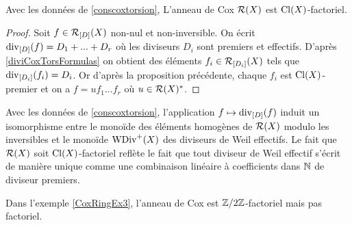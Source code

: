 \begin{thm}
Avec les données de \ref{conscoxtorsion}, L'anneau de Cox $\mathcal{R}(X)$ est $\operatorname{Cl}(X)$-factoriel.
\end{thm}
\begin{proof}
Soit $f\in\mathcal{R}_{[D]}(X)$ non-nul et non-inversible. On écrit $\operatorname{div}_{[D]}(f)=D_1+...+D_r$ où les diviseurs $D_i$ sont premiers et effectifs. D'après \ref{diviCoxTorsFormulas} on obtient des éléments $f_i\in\mathcal{R}_{[D_i]}(X)$ tels que $\operatorname{div}_{[D_i]}(f_i)=D_i$. Or d'après la proposition précédente, chaque $f_i$ est $\operatorname{Cl}(X)$-premier et on a $f=uf_1...f_r$ où $u\in\mathcal{R}(X)^*$.
\end{proof}

\begin{rem}
Avec les données de \ref{conscoxtorsion}, l'application $f\mapsto \operatorname{div}_{[D]}(f)$ induit un isomorphisme entre le monoïde des éléments homogènes de $\mathcal{R}(X)$ modulo les inversibles et le monoïde $\operatorname{WDiv}^+(X)$ des diviseurs de Weil effectifs. Le fait que $\mathcal{R}(X)$ soit $\operatorname{Cl}(X)$-factoriel reflète le fait que tout diviseur de Weil effectif s'écrit de manière unique comme une combinaison linéaire à coefficients dans $\mathbb{N}$ de diviseur premiers.
\end{rem}

\begin{ex}
Dans l'exemple \ref{CoxRingEx3}, l'anneau de Cox est $\mathbb{Z}/2\mathbb{Z}$-factoriel mais pas factoriel.
\end{ex}

